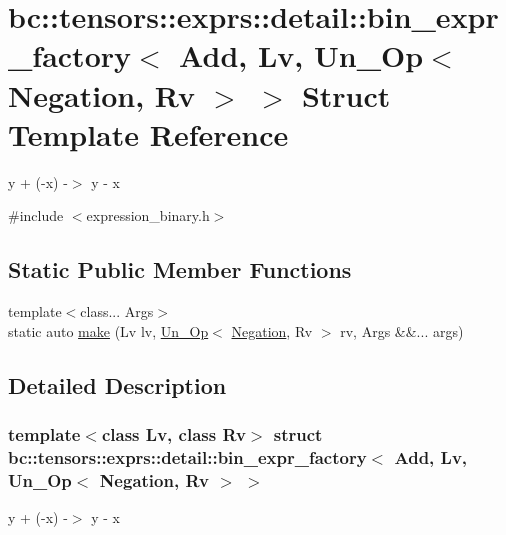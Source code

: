\hypertarget{structbc_1_1tensors_1_1exprs_1_1detail_1_1bin__expr__factory_3_01Add_00_01Lv_00_01Un__Op_3_01Negation_00_01Rv_01_4_01_4}{}\section{bc\+:\+:tensors\+:\+:exprs\+:\+:detail\+:\+:bin\+\_\+expr\+\_\+factory$<$ Add, Lv, Un\+\_\+\+Op$<$ Negation, Rv $>$ $>$ Struct Template Reference}
\label{structbc_1_1tensors_1_1exprs_1_1detail_1_1bin__expr__factory_3_01Add_00_01Lv_00_01Un__Op_3_01Negation_00_01Rv_01_4_01_4}


y + (-\/x) -\/$>$ y -\/ x  




{\ttfamily \#include $<$expression\+\_\+binary.\+h$>$}

\subsection*{Static Public Member Functions}
\begin{DoxyCompactItemize}
\item 
{\footnotesize template$<$class... Args$>$ }\\static auto \hyperlink{structbc_1_1tensors_1_1exprs_1_1detail_1_1bin__expr__factory_3_01Add_00_01Lv_00_01Un__Op_3_01Negation_00_01Rv_01_4_01_4_a944b39251590d4173c2b26fb485863e2}{make} (Lv lv, \hyperlink{structbc_1_1tensors_1_1exprs_1_1Un__Op}{Un\+\_\+\+Op}$<$ \hyperlink{structbc_1_1oper_1_1Negation}{Negation}, Rv $>$ rv, Args \&\&... args)
\end{DoxyCompactItemize}


\subsection{Detailed Description}
\subsubsection*{template$<$class Lv, class Rv$>$\newline
struct bc\+::tensors\+::exprs\+::detail\+::bin\+\_\+expr\+\_\+factory$<$ Add, Lv, Un\+\_\+\+Op$<$ Negation, Rv $>$ $>$}

y + (-\/x) -\/$>$ y -\/ x 

